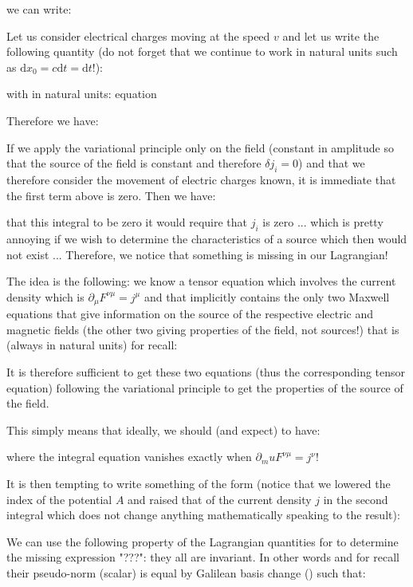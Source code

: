 	we can write:
	
	Let us consider electrical charges moving at the speed $v$ and let us write the following quantity (do not forget that we continue to work in natural units such as $\mathrm{d}x_0=c\mathrm{d}t=\mathrm{d}t$!):
	
	with in natural units: equation
	
	Therefore we have:
	
	If we apply the variational principle only on the field (constant in amplitude so that the source of the field is constant and therefore $\delta j_i=0$) and that we therefore consider the movement of electric charges known, it is immediate that the first term above is zero. Then we have:
	
	that this integral to be zero it would require that $j_i$ is zero ... which is pretty annoying if we wish to determine the characteristics of a source which then would not exist ... Therefore, we notice that something is missing in our Lagrangian!

	The idea is the following: we know a tensor equation which involves the current density which is $\partial_\mu F^{\nu\mu}=j^\mu$ and that implicitly contains the only two Maxwell equations that give information on the source of the respective electric and magnetic fields (the other two giving properties of the field, not sources!) that is (always in natural units) for recall:
	
	It is therefore sufficient to get these two equations (thus the corresponding tensor equation) following the variational principle to get the properties of the source of the field.
	
	This simply means that ideally, we should (and expect) to have:
	
	where the integral equation vanishes exactly when $\partial_mu F^{\nu\mu}=j^\nu$!

	It is then tempting to write something of the form (notice that we lowered the index of the potential $A$ and raised that of the current density $j$ in the second integral which does not change anything mathematically speaking to the result):
	
	We can use the following property of the Lagrangian quantities for to determine the missing expression "???": they all are invariant. In other words and for recall their pseudo-norm (scalar) is equal by Galilean basis change () such that:
	
